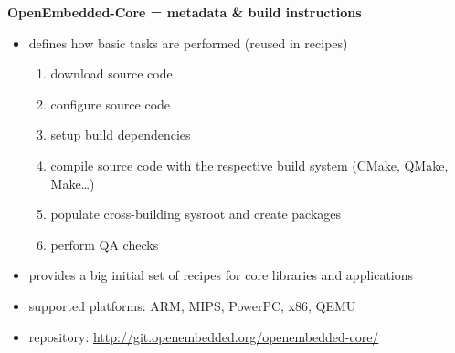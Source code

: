 \documentclass[ucs,9pt]{beamer}
\begin{document}
\begin{frame}
    \textbf{OpenEmbedded-Core = metadata \& build instructions}
    \begin{itemize}
        \item defines how basic tasks are performed (reused in recipes)
        \begin{enumerate}
            \item download source code
            \item configure source code
            \item setup build dependencies
            \item compile source code with the respective build system (CMake, QMake, Make\ldots)
            \item populate cross-building sysroot and create packages
            \item perform QA checks
        \end{enumerate}
        \item provides a big initial set of recipes for core libraries and applications
        \item supported platforms: ARM, MIPS, PowerPC, x86, QEMU
        \item repository: \url{http://git.openembedded.org/openembedded-core/}
    \end{itemize}
\end{frame}
\end{document}
